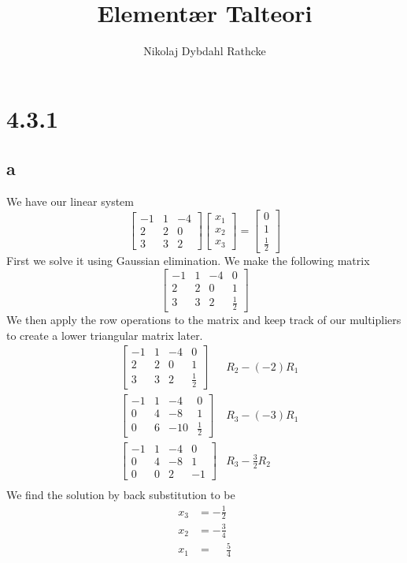 \documentclass[12pt]{article}
\title{Elementær Talteori}
\author{Nikolaj Dybdahl Rathcke}
\begin{document}
\section*{4.3.1}
\subsection*{a}
We have our linear system
$$
\begin{bmatrix}
-1 & 1 & -4 \\
2 & 2 & 0 \\
3 & 3 & 2
\end{bmatrix}
\begin{bmatrix}
x_1 \\
x_2 \\
x_3
\end{bmatrix}
=
\begin{bmatrix}
0 \\
1 \\
\frac{1}{2}
\end{bmatrix}
$$
First we solve it using Gaussian elimination. We make the following matrix
$$
\begin{bmatrix}
-1 & 1 & -4 & 0\\
2 & 2 & 0 & 1\\
3 & 3 & 2 & \frac{1}{2}
\end{bmatrix}
$$
We then apply the row operations to the matrix and keep track of our multipliers to create a lower triangular matrix later.
\begin{align*}
&\begin{bmatrix}
-1 & 1 & -4 & 0\\
2 & 2 & 0 & 1\\ 
3 & 3 & 2 & \frac{1}{2}
\end{bmatrix}
&R_2-(-2)R_1 \\
&\begin{bmatrix}
-1 & 1 & -4 & 0\\
0 & 4 & -8 & 1\\
0 & 6 & -10 & \frac{1}{2}
\end{bmatrix}
&R_3-(-3)R_1\\
&\begin{bmatrix}
-1 & 1 & -4 & 0\\
0 & 4 & -8 & 1\\
0 & 0 & 2 & -1
\end{bmatrix}
&R_3-\frac{3}{2}R_2\\
\end{align*}
We find the solution by back substitution to be
\begin{align*}
x_3&=-\frac{1}{2}\\
x_2&=-\frac{3}{4}\\
x_1&=\phantom{-}\frac{5}{4}
\end{align*}
\end{document}
